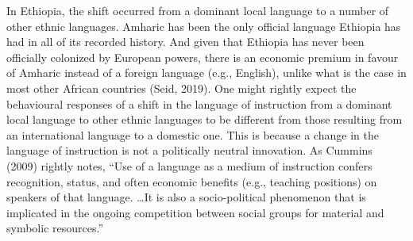 In Ethiopia, the shift occurred from a dominant local language to a number of other ethnic languages. Amharic has been the only official language Ethiopia has had in all of its recorded history. And given that Ethiopia has never been officially colonized by European powers, there is an economic premium in favour of Amharic instead of a foreign language (e.g., English), unlike what is the case in most other African countries (Seid, 2019). One might rightly expect the behavioural responses of a shift in the language of instruction from a dominant local language to other ethnic languages to be different from those resulting from an international language to a domestic one. This is because a change in the language of instruction is not a politically neutral innovation. As Cummins (2009) rightly notes, “Use of a language as a medium of instruction confers recognition, status, and often economic benefits (e.g., teaching positions) on speakers of that language. \dots It is also a socio-political phenomenon that is implicated in the ongoing competition between social groups for material and symbolic resources.”
